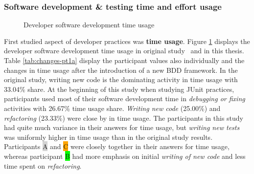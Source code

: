 \subsubsection{Software development \& testing time and effort usage}
    \begin{figure}[ht]%
        \centering
        \qquad
        \caption{Developer software development time usage}%
        \label{fig:time-usage}%
    \end{figure}
First studied aspect of developer practices was \textbf{time usage}. Figure \ref{fig:time-usage} displays the developer software development time usage
in original study~\cite{daka2014survey} and in this thesis. Table \ref{tab:changes-pt1a} display the participant values
also individually and the changes in time usage after the introduction of a new BDD framework. In the original study, writing
new code is the dominating activity in time usage with 33.04\% share. At the beginning of this study when studying JUnit practices,
participants used most of their software development
time in \textit{debugging or fixing} activities with 26.67\% time usage share. \textit{Writing new code} (25.00\%) and \textit{refactoring} (23.33\%) were close
by in time usage. The participants in this study had quite much variance in their answers for time usage, but \textit{writing
new tests} was uniformly higher in time usage than in the original study results. Participants {\colorbox{lightgray}A} and {\colorbox{orange}C}
were closely together in their answers for time usage, whereas participant {\colorbox{lime}B} had more emphasis on initial \textit{writing of new code} and
less time spent on \textit{refactoring}.

